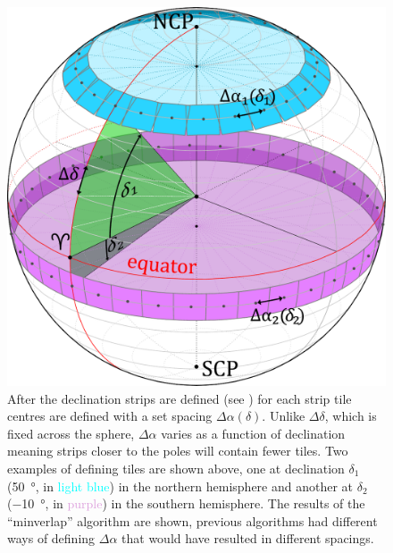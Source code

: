 \begin{colsection}
\begin{colsection}
\begin{figure}[p]
\begin{center}
\includegraphics[width=\linewidth]{images/globe3.pdf}
\end{center}
\caption[Defining the spacing between tiles]{After the declination strips are defined (see ) for each strip tile centres are defined with a set spacing $\Delta\alpha(\delta)$. Unlike $\Delta\delta$, which is fixed across the sphere, $\Delta\alpha$ varies as a function of declination meaning strips closer to the poles will contain fewer tiles. Two examples of defining tiles are shown above, one at declination $\delta_1$ (\SI{50}{\degree}, in \textcolor{cyan}{light blue}) in the northern hemisphere and another at $\delta_2$ (\SI{-10}{\degree}, in \textcolor{Plum}{purple}) in the southern hemisphere. The results of the ``minverlap'' algorithm are shown, previous algorithms had different ways of defining $\Delta\alpha$ that would have resulted in different spacings.
}
\label{fig:deltaalpha}
\end{figure}


\end{colsection}
\end{colsection}
